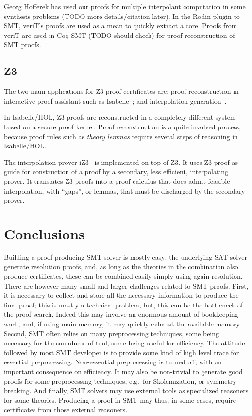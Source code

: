 \documentclass{llncs}
\begin{document}
Georg Hofferek has used our proofs for multiple interpolant computation in some synthesis problems (TODO more details/citation later).  In the Rodin plugin to SMT, veriT's proofs are used as a mean to quickly extract a core.  Proofs from veriT are used in Coq-SMT (TODO should check) for proof reconstruction of SMT proofs.

\subsection{Z3}

The two main applications for Z3 proof certificates are: proof
reconstruction in interactive proof assistant such as
Isabelle~\cite{IsabelleZ3}; and interpolation generation~\cite{iZ3}.

In Isabelle/HOL, Z3 proofs are reconstructed in a completely different
system based on a secure proof kernel. Proof reconstruction is a quite
involved process, because proof rules such as \emph{theory lemmas} require
several steps of reasoning in Isabelle/HOL.

The interpolation prover iZ3~\cite{iZ3} is implemented on top of Z3.  It uses Z3
proof as guide for construction of a proof by a secondary, less
efficient, interpolating prover. It translates Z3 proofs into
a proof calculus that does admit feasible interpolation, with
``gaps'', or lemmas, that must be discharged by the secondary prover.

\section{Conclusions}
\label{sec:concl}


Building a proof-producing SMT solver is mostly easy: the underlying SAT solver
generate resolution proofs, and, as long as the theories in the combination also
produce certificates, these can be combined easily simply using again
resolution.  There are however many small and larger challenges related to SMT
proofs.  First, it is necessary to collect and store all the necessary
information to produce the final proof; this is mostly a technical problem, but,
this can be the bottleneck of the proof search.  Indeed this may involve an
enormous amount of bookkeeping work, and, if using main memory, it may quickly
exhaust the available memory.  Second, SMT often relies on many preprocessing
techniques, some being necessary for the soundness of tool, some being useful
for efficiency.  The attitude followed by most SMT developer is to provide some
kind of high level trace for essential preprocessing.  Non-essential
preprocessing is turned off, with an important consequence on efficiency.  It
may also be non-trivial to generate good proofs for some preprocessing
techniques, e.g.\ for Skolemization, or symmetry breaking.  And finally, SMT
solvers may use external tools as specialized reasoners for some
theories. Producing a proof
in SMT may thus, in some cases, require certificates from those external
reasoners.
\end{document}
